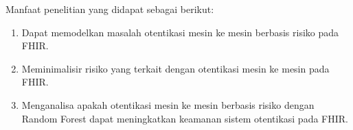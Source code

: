 Manfaat penelitian yang didapat sebagai berikut:

\begin{enumerate}
    \item Dapat memodelkan masalah otentikasi mesin ke mesin berbasis risiko pada FHIR.
    \item Meminimalisir risiko yang terkait dengan otentikasi mesin ke mesin pada FHIR.
    \item Menganalisa apakah otentikasi mesin ke mesin berbasis risiko dengan Random Forest dapat meningkatkan keamanan sistem otentikasi pada FHIR.
\end{enumerate}